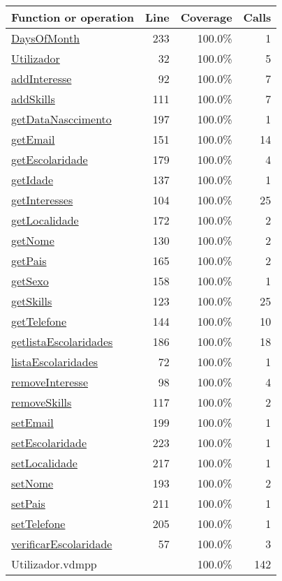 \begin{longtable}{|l|r|r|r|}
\hline
Function or operation & Line & Coverage & Calls \\
\hline
\hline
\hyperref[DaysOfMonth:233]{DaysOfMonth} & 233&100.0\% & 1 \\
\hline
\hyperref[Utilizador:32]{Utilizador} & 32&100.0\% & 5 \\
\hline
\hyperref[addInteresse:92]{addInteresse} & 92&100.0\% & 7 \\
\hline
\hyperref[addSkills:111]{addSkills} & 111&100.0\% & 7 \\
\hline
\hyperref[getDataNasccimento:197]{getDataNasccimento} & 197&100.0\% & 1 \\
\hline
\hyperref[getEmail:151]{getEmail} & 151&100.0\% & 14 \\
\hline
\hyperref[getEscolaridade:179]{getEscolaridade} & 179&100.0\% & 4 \\
\hline
\hyperref[getIdade:137]{getIdade} & 137&100.0\% & 1 \\
\hline
\hyperref[getInteresses:104]{getInteresses} & 104&100.0\% & 25 \\
\hline
\hyperref[getLocalidade:172]{getLocalidade} & 172&100.0\% & 2 \\
\hline
\hyperref[getNome:130]{getNome} & 130&100.0\% & 2 \\
\hline
\hyperref[getPais:165]{getPais} & 165&100.0\% & 2 \\
\hline
\hyperref[getSexo:158]{getSexo} & 158&100.0\% & 1 \\
\hline
\hyperref[getSkills:123]{getSkills} & 123&100.0\% & 25 \\
\hline
\hyperref[getTelefone:144]{getTelefone} & 144&100.0\% & 10 \\
\hline
\hyperref[getlistaEscolaridades:186]{getlistaEscolaridades} & 186&100.0\% & 18 \\
\hline
\hyperref[listaEscolaridades:72]{listaEscolaridades} & 72&100.0\% & 1 \\
\hline
\hyperref[removeInteresse:98]{removeInteresse} & 98&100.0\% & 4 \\
\hline
\hyperref[removeSkills:117]{removeSkills} & 117&100.0\% & 2 \\
\hline
\hyperref[setEmail:199]{setEmail} & 199&100.0\% & 1 \\
\hline
\hyperref[setEscolaridade:223]{setEscolaridade} & 223&100.0\% & 1 \\
\hline
\hyperref[setLocalidade:217]{setLocalidade} & 217&100.0\% & 1 \\
\hline
\hyperref[setNome:193]{setNome} & 193&100.0\% & 2 \\
\hline
\hyperref[setPais:211]{setPais} & 211&100.0\% & 1 \\
\hline
\hyperref[setTelefone:205]{setTelefone} & 205&100.0\% & 1 \\
\hline
\hyperref[verificarEscolaridade:57]{verificarEscolaridade} & 57&100.0\% & 3 \\
\hline
\hline
Utilizador.vdmpp & & 100.0\% & 142 \\
\hline
\end{longtable}

